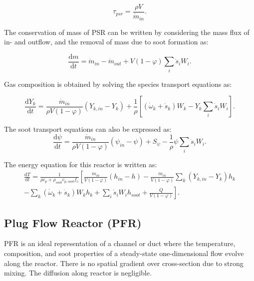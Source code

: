 \begin{equation}
	\tau_{psr} = \frac{\rho V}{\dot{m}_{in}}
	\label{eqn:taupsr}.
\end{equation} 

The conservation of mass of PSR can be written by considering the mass flux of in- and outflow, and the removal of mass due to soot formation as:

\begin{equation}
	\frac{\mathrm{d} m}{\mathrm{d} t}
	=
	\dot{m}_{in} - \dot{m}_{out} 
	+ V(1 - \varphi)\sum_i \dot{s}_i W_i 
	\label{eqn:contpsr}.
\end{equation}

Gas composition is obtained by solving the species transport equations as:

\begin{equation}
	\frac{\mathrm{d} Y_k}{\mathrm{d} t}
	=
	\frac{{\dot{m}}_{in}}{\rho V
		\left(1-\varphi\right)}
	\left(Y_{k,in}-Y_k \right)+
	\frac{1}{\rho}\left[\left(\dot{\omega}_k+\dot{s}_k\right) W_k-Y_k \sum_i \dot{s}_i W_i\right]
	\label{eqn:speciespsr}.
\end{equation}

The soot transport equations can also be expressed as:
\begin{equation}
	\frac{\mathrm{d}\psi}{\mathrm{d}t}
	=
	\frac{{\dot{m}}_{in}}{\rho V
		\left(1-\varphi\right)}
	\left(\psi_{in}-\psi\right)
	+
	S_{\psi}
	-\frac{1}{\rho}\psi\sum_{i}{{\dot{s}}_i W_i}
	\label{eqn:sootpsr}.
\end{equation}

The energy equation for this reactor is written as:
\begin{equation}
	\begin{split}
		\frac{\mathrm{d}T}{\mathrm{d}t}
		=
		\frac{1}
		{
			\rho c_p+\rho_{soot}c_{p,soot}f_v
		}
		\left[
		\frac{{\dot{m}}_{in}}{V(1 - \varphi)}
		\left(h_{in}-h\right)
		-
		\frac{{\dot{m}}_{in}}{V (1 - \varphi)}\sum_{k}\left(Y_{k,in}-Y_k\right)h_k
		\right.\\
		\left.	
		-
		\sum_{k}{
			\left(
			{\dot{\omega}}_k
			+
			{\dot{s}}_k
			\right) W_k h_k}
		+\sum_{i}{{\dot{s}}_i W_i} h_{soot}+\frac{\dot{Q}}{V(1 - \varphi)}
		\right].
	\end{split}
	\label{eqn:energypsr}
\end{equation}



\subsection{Plug Flow Reactor (PFR)}
\label{sec:pfr}
PFR is an ideal representation of a channel or duct where the temperature, composition, and soot properties of a steady-state one-dimensional flow evolve along the reactor. There is no spatial gradient over cross-section due to strong mixing. The diffusion along reactor is negligible.


